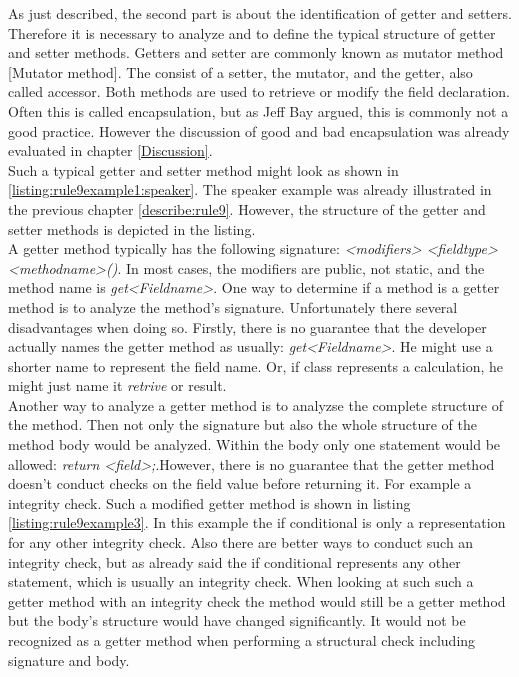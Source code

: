 As just described, the second part is about the identification of getter and setters. Therefore it is necessary to analyze and to define the typical structure of getter and setter methods. Getters and setter are commonly known as mutator method \cite{wiki}[Mutator method]. The consist of a setter, the mutator, and the getter, also called accessor. Both methods are used to retrieve or modify the field declaration. Often this is called encapsulation, but as Jeff Bay argued, this is commonly not a good practice. However the discussion of good and bad encapsulation was already evaluated in chapter \ref{Discussion}.
\\

Such a typical getter and setter method might look as shown in \ref{listing:rule9example1:speaker}. The speaker example was already illustrated in the previous chapter \ref{describe:rule9}. However, the structure of the getter and setter methods is depicted in the listing. 
\\

A getter method typically has the following signature: \textit{<modifiers> <fieldtype> <methodname>()}. In most cases, the modifiers are public, not static, and the method name is \textit{get<Fieldname>}. One way to determine if a method is a getter method is to analyze the method's signature. Unfortunately there several disadvantages when doing so. Firstly, there is no guarantee that the developer actually names the getter method as usually: \textit{get<Fieldname>}. He might use a shorter name to represent the field name. Or, if class represents a calculation, he might just name it \textit{retrive} or {result}. 
\\

Another way to analyze a getter method is to analyzse the complete structure of the method. Then not only the signature but also the whole structure of the method body would be analyzed. Within the body only one statement would be allowed: \textit{return <field>;}.However, there is no guarantee that the getter method doesn't conduct checks on the field value before returning it. For example a integrity check. Such a modified getter method is shown in listing \ref{listing:rule9example3}. In this example the if conditional is only a representation for any other integrity check. Also there are better ways to conduct such an integrity check, but as already said the if conditional represents any other statement, which is usually an integrity check. When looking at such such a getter method with an integrity check the method would still be a getter method but the body's structure would have changed significantly. It would not be recognized as a getter method when performing a structural check including signature and body.
\\

